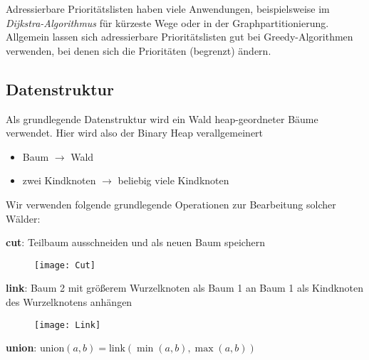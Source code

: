 Adressierbare Prioritätslisten haben viele Anwendungen, beispielsweise im \emph{Dijkstra-Algorithmus} für kürzeste Wege oder in der Graphpartitionierung. Allgemein lassen sich adressierbare Prioritätslisten gut bei Greedy-Algorithmen verwenden, bei denen sich die Prioritäten (begrenzt) ändern.

\subsection{Datenstruktur}

Als grundlegende Datenstruktur wird ein Wald heap-geordneter Bäume verwendet. Hier wird also der Binary Heap verallgemeinert
\begin{itemize}
  \item Baum \( \to \) Wald
  \item zwei Kindknoten \( \to \) beliebig viele Kindknoten
\end{itemize}

Wir verwenden folgende grundlegende Operationen zur Bearbeitung solcher Wälder:
\begin{itemize}

  \begin{minipage}{.475\textwidth}
    \item \textbf{cut}: Teilbaum ausschneiden und als neuen Baum speichern
  \end{minipage}
  \hfill
  \begin{minipage}{.475\textwidth}
    \begin{figure}[H]
      \texttt{[image: Cut]}
    \end{figure}
  \end{minipage}

  \begin{minipage}{.475\textwidth}
    \item \textbf{link}: Baum 2 mit größerem Wurzelknoten als Baum 1 an Baum 1 als Kindknoten des Wurzelknotens anhängen
  \end{minipage}
  \hfill
  \begin{minipage}{.475\textwidth}
    \begin{figure}[H]
      \texttt{[image: Link]}
    \end{figure}
  \end{minipage}

  \item \textbf{union}: \( \text{union}(a,b) = \text{link}(\min(a,b), \max(a,b)) \)
\end{itemize}

